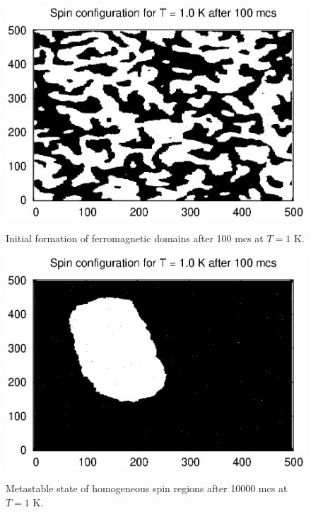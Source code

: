 \documentclass[a4paper]{article}
\begin{document}
\vspace{3mm}

\begin{figure}[h]
\centering
\begin{minipage}[b]{0.45\linewidth}
\includegraphics[width=1\textwidth]{cold_long.eps}
\label{fig:minipage1}
\caption{Initial formation of ferromagnetic domains after 100 mcs at $T = 1$ K.}
\end{minipage}
\quad
\begin{minipage}[b]{0.45\linewidth}
\includegraphics[width=1\textwidth]{cold.eps}
\label{fig:minipage2}
\caption{Metastable state of homogeneous spin regions after 10000 mcs at $T = 1$ K. }
\end{minipage}
\end{figure}
\end{document}
